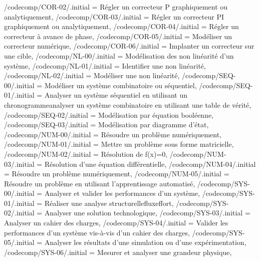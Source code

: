 {    /codecomp/COR-02/.initial = Régler un correcteur P graphiquement ou analytiquement,
    /codecomp/COR-03/.initial = Régler un correcteur PI graphiquement ou analytiquement,
    /codecomp/COR-04/.initial = Régler un correcteur à avance de phase,
    /codecomp/COR-05/.initial = Modéliser un correcteur numérique,
    /codecomp/COR-06/.initial = Implanter un correcteur sur une cible,
    /codecomp/NL-00/.initial = Modélisation des non linéarité d'un système,
    /codecomp/NL-01/.initial = Identifier une non linéarité,
    /codecomp/NL-02/.initial = Modéliser une non linéarité,
    /codecomp/SEQ-00/.initial = Modéliser un système combinatoire ou séquentiel,
    /codecomp/SEQ-01/.initial = Analyser un système séquentiel en utilisant un chronogramme\CommaXp analyser un système combinatoire en utilisant une table de vérité,
    /codecomp/SEQ-02/.initial = Modélisation par équation booléenne,
    /codecomp/SEQ-03/.initial = Modélisation par diagramme d'état,
    /codecomp/NUM-00/.initial = Résoudre un problème numériquement,
    /codecomp/NUM-01/.initial = Mettre un problème sous forme matricielle,
    /codecomp/NUM-02/.initial = Résolution de f(x)=0,
    /codecomp/NUM-03/.initial = Résolution d'une équation différentielle,
    /codecomp/NUM-04/.initial = Résoudre un problème numériquement,
    /codecomp/NUM-05/.initial = Résoudre un problème en utilisant l'apprentissage automatisé,
    /codecomp/SYS-00/.initial = Analyser et valider les performances d'un système,
    /codecomp/SYS-01/.initial = Réaliser une analyse structurelle\CommaXp flux\CommaXp effort,
    /codecomp/SYS-02/.initial = Analyser une solution technologique,
    /codecomp/SYS-03/.initial = Analyser un cahier des charges,
    /codecomp/SYS-04/.initial = Valider les performances d'un système vis-à-vis d'un cahier des charges,
    /codecomp/SYS-05/.initial = Analyser les résultats d'une simulation ou d'une expérimentation,
    /codecomp/SYS-06/.initial = Mesurer et analyser une grandeur physique,
}

\newcommand{\compForCodecomp}[2]{\xpComp{#1}{#2} \pgfkeysvalueof{/codecomp/#1-#2}}


\newcommand{\deuxcolxp}[2]{
\begin{minipage}[c]{1cm} \xpComp{#1}{#2} \end{minipage} \hspace{.3cm} %
\begin{minipage}[c]{8cm} \pgfkeysvalueof{/codecomp/#1-#2}\end{minipage} \\ \vspace{-0.2cm} \\}



